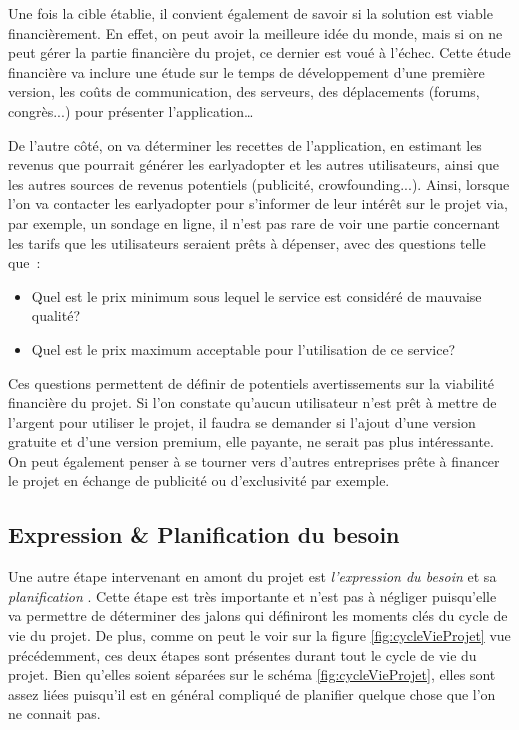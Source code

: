 Une fois la cible établie, il convient également de savoir si la solution est viable financièrement. En effet, on peut avoir la meilleure idée du monde, mais si on ne peut gérer la partie financière du projet, ce dernier est voué à l'échec. Cette étude financière va inclure une étude sur le temps de développement d'une première version, les coûts de communication, des serveurs, des déplacements (forums, congrès...) pour présenter l'application\ldots

De l'autre côté, on va déterminer les recettes de l'application, en estimant les revenus que pourrait générer les \gls{earlyadopter} et les autres utilisateurs, ainsi que les autres sources de revenus potentiels (publicité, crowfounding...). Ainsi, lorsque l'on va contacter les \gls{earlyadopter} pour s'informer de leur intérêt sur le projet via, par exemple, un sondage en ligne, il n'est pas rare de voir une partie concernant les tarifs que les utilisateurs seraient prêts à dépenser, avec des questions telle que :

\begin{itemize}
	\setlength\itemsep{-0.5em}
	\item Quel est le prix minimum sous lequel le service est considéré de mauvaise qualité?
	\item Quel est le prix maximum acceptable pour l'utilisation de ce service?
\end{itemize}

Ces questions permettent de définir de potentiels avertissements sur la viabilité financière du projet. Si l'on constate qu'aucun utilisateur n'est prêt à mettre de l'argent pour utiliser le projet, il faudra se demander si l'ajout d'une version gratuite et d'une version premium, elle payante, ne serait pas plus intéressante. On peut également penser à se tourner vers d'autres entreprises prête à financer le projet en échange de publicité ou d'exclusivité par exemple.


\subsection{Expression \& Planification du besoin}

Une autre étape intervenant en amont du projet est \emph{l'expression du besoin} et sa \emph{planification} . Cette étape est très importante et n'est pas à négliger puisqu'elle va permettre de déterminer des jalons qui définiront les moments clés du cycle de vie du projet. De plus, comme on peut le voir sur la figure \ref{fig:cycleVieProjet} vue précédemment, ces deux étapes sont présentes durant tout le cycle de vie du projet. Bien qu'elles soient séparées sur le schéma \ref{fig:cycleVieProjet}, elles sont assez liées puisqu'il est en général compliqué de planifier quelque chose que l'on ne connait pas.

